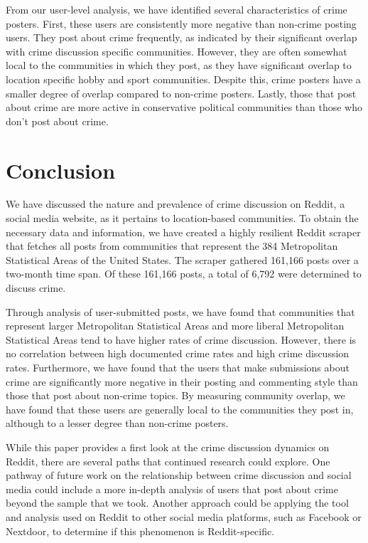 \documentclass[12pt,oneside, letterpaper]{book}
\begin{document}
\par From our user-level analysis, we have identified several characteristics of crime posters. First, these users are consistently more negative than non-crime posting users. They post about crime frequently, as indicated by their significant overlap with crime discussion specific communities. However, they are often somewhat local to the communities in which they post, as they have significant overlap to location specific hobby and sport communities. Despite this, crime posters have a smaller degree of overlap compared to non-crime posters. Lastly, those that post about crime are more active in conservative political communities than those who don't post about crime.

\chapter{Conclusion}

\par We have discussed the nature and prevalence of crime discussion on Reddit, a social media website, as it pertains to location-based communities. To obtain the necessary data and information, we have created a highly resilient Reddit scraper that fetches all posts from communities that represent the 384 Metropolitan Statistical Areas of the United States. The scraper gathered 161,166 posts over a two-month time span. Of these 161,166 posts, a total of 6,792 were determined to discuss crime. 

\par Through analysis of user-submitted posts, we have found that communities that represent larger Metropolitan Statistical Areas and more liberal Metropolitan Statistical Areas tend to have higher rates of crime discussion. However, there is no correlation between high documented crime rates and high crime discussion rates. Furthermore, we have found that the users that make submissions about crime are significantly more negative in their posting and commenting style than those that post about non-crime topics. By measuring community overlap, we have found that these users are generally local to the communities they post in, although to a lesser degree than non-crime posters.

\par While this paper provides a first look at the crime discussion dynamics on Reddit, there are several paths that continued research could explore. One pathway of future work on the relationship between crime discussion and social media could include a more in-depth analysis of users that post about crime beyond the sample that we took. Another approach could be applying the tool and analysis used on Reddit to other social media platforms, such as Facebook or Nextdoor, to determine if this phenomenon is Reddit-specific.
\end{document}
